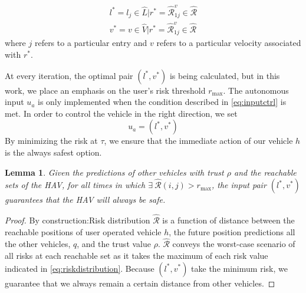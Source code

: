 \documentclass[letterpaper, 10 pt, conference]{ieeeconf}  %
\newtheorem{lemma}{Lemma}
\newcommand\NB[1]{$\spadesuit$\footnote{NB: #1}}
\begin{document}
\begin{align} \label{eq:optpair}
    l^* =  l_j\in\hat{L}\vert r^* = \hat{\mathcal{R}}_{1j}^{v}\in\hat{\mathcal{R}} \nonumber \\
    v^* =  v\in\hat{V}\vert r^* = \hat{\mathcal{R}}_{1j}^{v}\in\hat{\mathcal{R}}
\end{align}
where $j$ refers to a particular entry and $v$ refers to a particular velocity associated with $r^*$.


At every iteration, the optimal pair $(l^*,v^*)$ is being calculated, but in this work, we place an emphasis on the user's risk threshold $r_\max$. The autonomous input $u_a$ is only implemented when the condition described in \eqref{eq:inputctrl} is met. In order to control the vehicle in the right direction, we set
\begin{equation}
u_a = (l^*,v^*)    
\end{equation}
By minimizing the risk at $\tau$, we ensure that the immediate action of our vehicle $h$ is the always safest option.

\begin{lemma}
Given the predictions of other vehicles with trust $\rho$ and the reachable sets of the HAV, for all times in which $\exists~\hat{\mathcal{R}}(i,j) > r_\max$, the input pair $(l^*,v^*)$ guarantees that the HAV will always be safe. 
\end{lemma}

\begin{proof}
By construction:Risk distribution $\hat{\mathcal{R}}$ is a function of distance between the reachable positions of user operated vehicle $h$, the future position predictions all the other vehicles, $q$, and the trust value $\rho$. $\hat{\mathcal{R}}$ conveys the worst-case scenario of all risks at each reachable set as it takes the maximum of each risk value indicated in \eqref{eq:riskdistribution}. Because $(l^*,v^*)$ take the minimum risk, we guarantee that we always remain a certain distance from other vehicles. 
\end{proof}
\end{document}
